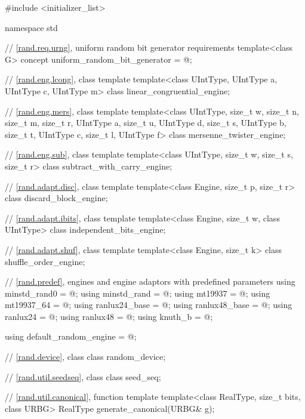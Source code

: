 \begin{codeblock}
#include <initializer_list>

namespace std {
  // \ref{rand.req.urng}, uniform random bit generator requirements
  template<class G>
    concept uniform_random_bit_generator = @\seebelow@;

  // \ref{rand.eng.lcong}, class template 
  template<class UIntType, UIntType a, UIntType c, UIntType m>
    class linear_congruential_engine;

  // \ref{rand.eng.mers}, class template 
  template<class UIntType, size_t w, size_t n, size_t m, size_t r,
           UIntType a, size_t u, UIntType d, size_t s,
           UIntType b, size_t t,
           UIntType c, size_t l, UIntType f>
    class mersenne_twister_engine;

  // \ref{rand.eng.sub}, class template 
  template<class UIntType, size_t w, size_t s, size_t r>
    class subtract_with_carry_engine;

  // \ref{rand.adapt.disc}, class template 
  template<class Engine, size_t p, size_t r>
    class discard_block_engine;

  // \ref{rand.adapt.ibits}, class template 
  template<class Engine, size_t w, class UIntType>
    class independent_bits_engine;

  // \ref{rand.adapt.shuf}, class template 
  template<class Engine, size_t k>
    class shuffle_order_engine;

  // \ref{rand.predef}, engines and engine adaptors with predefined parameters
  using minstd_rand0  = @\seebelow@;
  using minstd_rand   = @\seebelow@;
  using mt19937       = @\seebelow@;
  using mt19937_64    = @\seebelow@;
  using ranlux24_base = @\seebelow@;
  using ranlux48_base = @\seebelow@;
  using ranlux24      = @\seebelow@;
  using ranlux48      = @\seebelow@;
  using knuth_b       = @\seebelow@;

  using default_random_engine = @\seebelow@;

  // \ref{rand.device}, class 
  class random_device;

  // \ref{rand.util.seedseq}, class 
  class seed_seq;

  // \ref{rand.util.canonical}, function template 
  template<class RealType, size_t bits, class URBG>
    RealType generate_canonical(URBG& g);

}
\end{codeblock}
